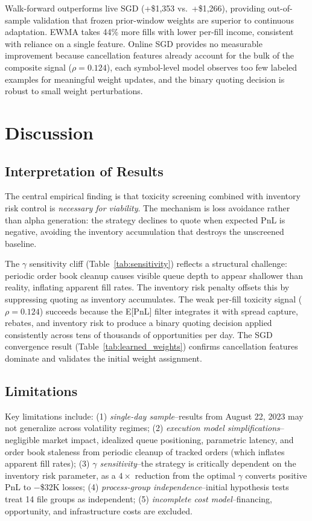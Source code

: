 \documentclass[11pt]{article}
\theoremstyle{definition}
\begin{document}
Walk-forward outperforms live SGD (+\$1,353 vs.\ +\$1,266), providing out-of-sample validation that frozen prior-window weights are superior to continuous adaptation. EWMA takes 44\% more fills with lower per-fill income, consistent with reliance on a single feature. Online SGD provides no measurable improvement because cancellation features already account for the bulk of the composite signal ($\rho = 0.124$), each symbol-level model observes too few labeled examples for meaningful weight updates, and the binary quoting decision is robust to small weight perturbations.

\section{Discussion}

\subsection{Interpretation of Results}

The central empirical finding is that toxicity screening combined with inventory risk control is \emph{necessary for viability}. The mechanism is loss avoidance rather than alpha generation: the strategy declines to quote when expected PnL is negative, avoiding the inventory accumulation that destroys the unscreened baseline.

The $\gamma$ sensitivity cliff (Table~\ref{tab:sensitivity}) reflects a structural challenge: periodic order book cleanup causes visible queue depth to appear shallower than reality, inflating apparent fill rates. The inventory risk penalty offsets this by suppressing quoting as inventory accumulates. The weak per-fill toxicity signal ($\rho = 0.124$) succeeds because the E[PnL] filter integrates it with spread capture, rebates, and inventory risk to produce a binary quoting decision applied consistently across tens of thousands of opportunities per day. The SGD convergence result (Table~\ref{tab:learned_weights}) confirms cancellation features dominate and validates the initial weight assignment.

\subsection{Limitations}
\label{sec:limitations}

Key limitations include: (1) \emph{single-day sample}--results from August 22, 2023 may not generalize across volatility regimes; (2) \emph{execution model simplifications}--negligible market impact, idealized queue positioning, parametric latency, and order book staleness from periodic cleanup of tracked orders (which inflates apparent fill rates); (3) \emph{$\gamma$ sensitivity}--the strategy is critically dependent on the inventory risk parameter, as a $4\times$ reduction from the optimal $\gamma$ converts positive PnL to $-$\$32K losses; (4) \emph{process-group independence}--initial hypothesis tests treat 14 file groups as independent; (5) \emph{incomplete cost model}--financing, opportunity, and infrastructure costs are excluded.
\end{document}
